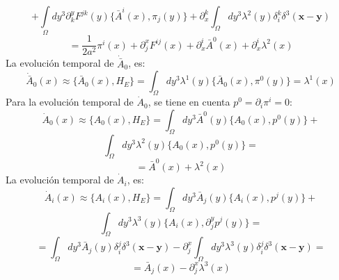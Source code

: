 \documentclass[a4paper,12pt]{article}
\begin{document}
$$+\int\limits_{\Omega}dy^{3}\partial_k^y F^{jk}(y)\{\bar{ A}^i(x),\pi_{j}(y)\}+\partial^k_x\int_{\Omega}dy^3\lambda^2(y)\delta^k_i\delta^3(\textbf{x}-\textbf{y})$$
$$=\frac{1}{2a^2}\pi^i(x)+\partial_j^xF^{ij}(x)+\partial^i_x\bar{ A}^0(x)+\partial^i_x\lambda^2(x)$$
La evolución temporal de $\dot{\bar{ A}}_0$, es:
\begin{equation}
\dot{\bar{ A}}_0(x)\approx\{\bar{ A}_0(x),H_E\}=\int_{\Omega}dy^3\lambda^1(y)\{\bar{ A}_0(x),\pi^0(y)\}=\lambda^1(x) 
\end{equation}
Para la evolución temporal de $\dot{ A}_0$, se tiene en cuenta $p^0=\partial_i\pi^i=0$:
\begin{equation}
\dot{ A}_0(x)\approx\{ A_0(x),H_E\}=\int_{\Omega}dy^3\bar{A}^0(y)\{ A_0(x),p^0(y)\}+ 
\end{equation}
$$\int_{\Omega}dy^3 \lambda^2(y)\{A_0(x),p^0(y)\}=$$
$$=\bar{A}^0(x)+\lambda^2(x)$$
La evolución temporal de $\dot{ A}_i$, es:
\begin{equation}
\dot{ A}_i(x)\approx\{ A_i(x),H_E\}=\int_{\Omega}dy^3\bar{A}_j(y)\{ A_i(x),p^j(y)\}+ 
\end{equation}
$$\int_{\Omega}dy^3 \lambda^3(y)\{A_i(x),\partial_j^yp^j(y)\}=$$
$$=\int_{\Omega}dy^3\bar{A}_j(y)\delta^j_i\delta^3(\textbf{x}-\textbf{y})-\partial_j^x\int_{\Omega}dy^3 \lambda^3(y)\delta^j_i\delta^3(\textbf{x}-\textbf{y})=$$
$$=\bar{A}_j(x)-\partial_j^x\lambda^3(x)$$
\vspace{0,4cm}

\\
\end{document}
